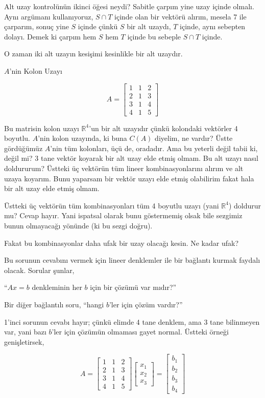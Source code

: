 \documentclass[12pt,fleqn]{article}\usepackage{../../common}
\begin{document}
Alt uzay kontrolünün ikinci öğesi neydi? Sabitle çarpım yine uzay içinde
olmalı. Aynı argümanı kullanıyoruz, $S \cap T$ içinde olan bir vektörü
alırım, mesela 7 ile çarparım, sonuç yine $S$ içinde çünkü $S$ bir alt
uzaydı, $T$ içinde, aynı sebepten dolayı. Demek ki çarpım hem $S$ hem $T$
içinde bu sebeple $S \cap T$ içinde.

O zaman iki alt uzayın kesişimi kesinlikle bir alt uzaydır. 

$A$'nin Kolon Uzayı

$$ A = 
\left[\begin{array}{rrr}
1 & 1 & 2 \\
2 & 1 & 3 \\
3 & 1 & 4 \\
4 & 1 & 5 
\end{array}\right]
 $$

Bu matrisin kolon uzayı $\mathbb{R}^4$'un bir alt uzayıdır çünkü kolondaki
vektörler 4 boyutlu. $A$'nin kolon uzayında, ki buna $C(A)$ diyelim, ne
vardır? Üstte gördüğümüz $A$'nin tüm kolonları, üçü de, oradadır. Ama bu
yeterli değil tabii ki, değil mi? 3 tane vektör koyarak bir alt uzay elde
etmiş olmam. Bu alt uzayı nasıl doldururum? Üstteki üç vektörün tüm lineer
kombinasyonlarını alırım ve alt uzaya koyarım. Bunu yaparsam bir vektör
uzayı elde etmiş olabilirim fakat hala bir alt uzay elde etmiş olmam. 

Üstteki üç vektörün tüm kombinasyonları tüm 4 boyutlu uzayı (yani
$\mathbb{R}^4$) doldurur mu? Cevap hayır. Yani ispatsal olarak bunu
göstermemiş olsak bile sezgimiz bunun olmayacağı yönünde (ki bu sezgi
doğru). 

Fakat bu kombinasyonlar daha ufak bir uzay olacağı kesin. Ne kadar ufak? 

Bu sorunun cevabını vermek için lineer denklemler ile bir bağlantı kurmak
faydalı olacak. Sorular şunlar,

``$Ax = b$ denkleminin her $b$ için bir çözümü var mıdır?''

Bir diğer bağlantılı soru, ``hangi $b$'ler için çözüm vardır?''

1'inci sorunun cevabı hayır; çünkü elimde 4 tane denklem, ama 3 tane
bilinmeyen var, yani bazı $b$'ler için çözümün olmaması gayet
normal. Üstteki örneği genişletirsek,

$$ A = 
\left[\begin{array}{rrr}
1 & 1 & 2 \\
2 & 1 & 3 \\
3 & 1 & 4 \\
4 & 1 & 5 
\end{array}\right]
\left[\begin{array}{r}
x_1  \\
x_2  \\
x_3  
\end{array}\right] 
=
\left[\begin{array}{r}
b_1  \\
b_2  \\
b_3  \\
b_4  
\end{array}\right]
 $$
\end{document}
